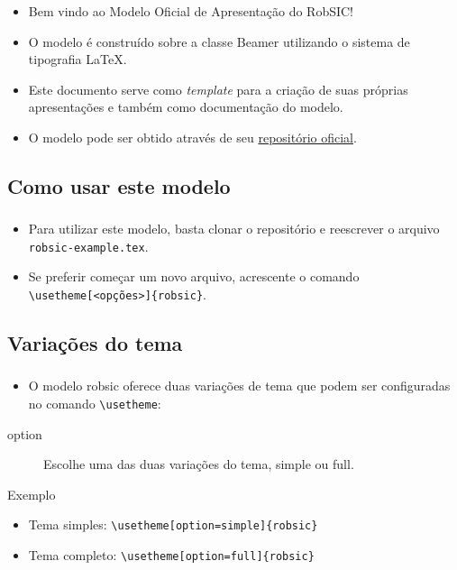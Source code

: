 \documentclass[12pt, xcolor=table, aspectratio=169]{beamer}
\makeatletter
\newcommand*{\currentname}{\@currentlabelname}
\makeatother
\begin{document}
\begin{frame}
 \frametitle{\currentname}
 \begin{itemize}
  \item Bem vindo ao Modelo Oficial de Apresentação do RobSIC!
  \item O modelo é construído sobre a classe Beamer utilizando o sistema de tipografia \LaTeX.
  \item Este documento serve como \textit{template} para a criação de suas próprias apresentações e também como documentação do modelo.
  \item O modelo pode ser obtido através de seu \href{https://github.com/Robsic/beamer-template-robsic}{repositório oficial}.
 \end{itemize}

\end{frame}

\subsection{Como usar este modelo}

\begin{frame}
 \frametitle{\currentname}
 \begin{itemize}
  \item Para utilizar este modelo, basta clonar o repositório e reescrever o arquivo \texttt{robsic-example.tex}.
  \item Se preferir começar um novo arquivo, acrescente o comando \texttt{{\textbackslash}usetheme[<opções>]\{robsic\}}.
 \end{itemize}

\end{frame}

\subsection{Variações do tema}

\begin{frame}
 \frametitle{\currentname}
 \begin{itemize}
  \item O modelo robsic oferece duas variações de tema que podem ser configuradas no comando \texttt{{\textbackslash}usetheme}:
  \end{itemize}
 \begin{description}
  \item[option] Escolhe uma das duas variações do tema, \alert{simple} ou \alert{full}.
 \end{description}
 
 \begin{exampleblock}{Exemplo}
  \begin{itemize}
   \item \alert{Tema simples:}\linebreak
         \texttt{{\textbackslash}usetheme[option=simple]\{robsic\}}
   \item \alert{Tema completo:}\linebreak
         \texttt{{\textbackslash}usetheme[option=full]\{robsic\}}
  \end{itemize}
 \end{exampleblock}
\end{frame}
\end{document}
